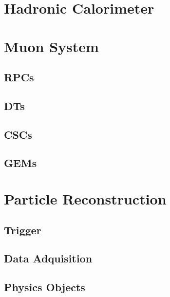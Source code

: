 \section{Hadronic Calorimeter}
\label{sec:HCal}

\section{Muon System}
\label{sec:MuonSys}

\subsection{RPCs}
\label{subsec:RPCs}

\subsection{DTs}
\label{subsec:DTs}

\subsection{CSCs}
\label{subsec:CSCs}

\subsection{GEMs}
\label{subsec:GEMs}

\section{Particle Reconstruction}
\label{sec:ParticleReconstruction}

\subsection{Trigger}
\label{subsec:Trigger}

\subsection{Data Adquisition}
\label{subsec:DAQ}

\subsection{Physics Objects}
\label{subsec:PhysicsObjects}
